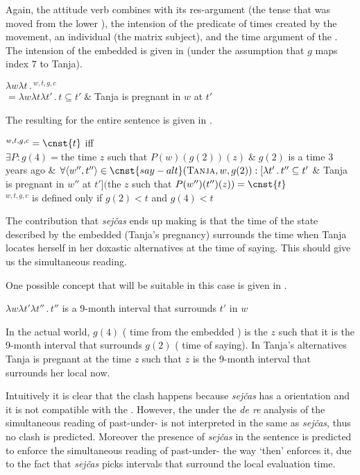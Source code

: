 \documentclass[output=paper,modfonts,newtxmath,hidelinks]{langscibook}
\begin{document}
 
Again, the attitude verb combines with its res-argument (the tense that was moved from the lower ), the intension of the predicate of times created by the movement, an individual (the matrix subject), and the time argument of the . The intension of the embedded  is given in  (under the assumption that $g$ maps index $7$ to Tanja).

\ea $\lambda w\lambda t\,.\,{}$$^{w,t,g,c}$\smallskip\\
\hspace{0.5cm}${}=\lambda w\lambda t\lambda t'\,.\,t\subseteq t'\;\&\;{}$Tanja is pregnant in $w$ at $t'$\label{20:ex47}
\z

\noindent The resulting  for the entire sentence is given in .\largerpage

\ea {}$^{w,t,g,c}=\cnst{t}$ iff\smallskip\\
$\exists P:g(4)={}$the time $z$ such that $P(w)(g(2))(z)\;\&\;g(2)$ is a time 3 years ago \& $\forall\langle w'',t''\rangle\in\cnst{say-alt}(\textsc{Tanja},w,g(2)):[\lambda t'\,.\,t''\subseteq t'$ \& Tanja is pregnant in $w''$ at $t']($the $z$ such that $P(w'')(t'')(z)) = \cnst{t}$\medskip\\
$^{w,t,g,c}$ is defined only if $g(2)<t$ and $g(4)<t$\label{20:ex48}
\z

\noindent The contribution that \textit{sejčas} ends up making is that the time of the state described by the embedded  (Tanja’s pregnancy) surrounds the time when Tanja locates herself in her doxastic alternatives at the time of saying. This should give us the simultaneous reading.

One possible concept that will be suitable in this case is given in .

\ea $\lambda w\lambda t'\lambda t''\,.\,t''$ is a 9-month interval that surrounds $t'$ in $w$\label{20:ex49}
\z

\noindent In the actual world, $g(4)$ ( time from the embedded ) is the $z$ such that it is the 9-month interval that surrounds $g(2)$ ( time of saying). In Tanja’s alternatives Tanja is pregnant at the time $z$ such that $z$ is the 9-month interval that surrounds her local now.

Intuitively it is clear that the clash happens because \textit{sejčas} has a  orientation and it is not compatible with the . However, the  under the \textit{de re} analysis of the simultaneous reading of past-under- is not interpreted in the same  as \textit{sejčas}, thus no clash is predicted. Moreover the presence of \textit{sejčas} in the sentence is predicted to enforce the simultaneous reading of past-under- the way `then' enforces it, due to the fact that \textit{sejčas} picks intervals that surround the local evaluation time.
\end{document}

